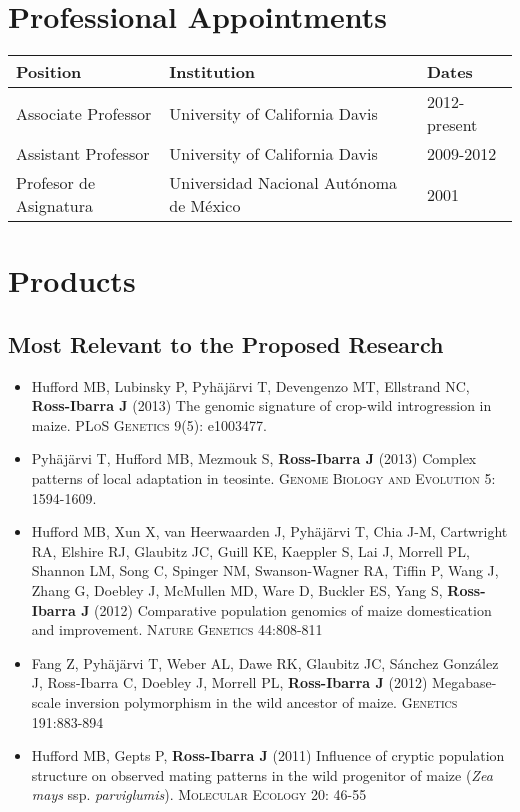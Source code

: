 \documentclass[11pt]{article}
\begin{document}
\section{Professional Appointments}

\begin{tabular}{l l l}
Position & Institution                 & Dates\\
\hline
Associate Professor & University of California Davis &		2012-present \\
Assistant Professor & University of California Davis &		2009-2012 \\
Profesor de Asignatura & Universidad Nacional Aut\'{o}noma de M\'{e}xico & 2001 \\
\hline
\end{tabular}

\section{Products}

\subsection*{Most Relevant to the Proposed Research}

\begin{itemize} \setlength{\itemsep}{0pt} \setlength{\parskip}{2pt} \setlength{\parsep}{0pt}

\item Hufford MB, Lubinsky P, Pyh\"aj\"arvi T, Devengenzo MT, Ellstrand NC, {\bf Ross-Ibarra J} (2013) The genomic signature of crop-wild introgression in maize. \textsc{PLoS Genetics} 9(5): e1003477. 

\item {Pyh\"aj\"arvi T}, {Hufford MB}, {Mezmouk S}, {\bf Ross-Ibarra J} (2013) Complex patterns of local adaptation in teosinte. \textsc{Genome Biology and Evolution} 5: 1594-1609.

\item Hufford MB, Xun X, van Heerwaarden J, Pyh\"aj\"arvi T, Chia J-M, Cartwright RA, Elshire RJ, Glaubitz JC, Guill KE, Kaeppler S, Lai J, Morrell PL, Shannon LM, Song C, Spinger NM, Swanson-Wagner RA, Tiffin P, Wang J, Zhang G, Doebley J, McMullen MD, Ware D, Buckler ES, Yang S, {\bf Ross-Ibarra J} (2012) Comparative population genomics of maize domestication and improvement. \textsc{Nature Genetics} 44:808-811

\item Fang Z, {Pyh\"aj\"arvi T}, Weber AL, Dawe RK, Glaubitz JC, S\'{a}nchez Gonz\'{a}lez J, {Ross-Ibarra C}, Doebley J, Morrell PL, {\bf Ross-Ibarra J}  (2012) Megabase-scale inversion polymorphism in the wild ancestor of maize. \textsc{Genetics} 191:883-894 

\item {Hufford MB}, Gepts P, {\bf Ross-Ibarra J} (2011) Influence of cryptic population structure on observed mating patterns in the wild progenitor of maize (\emph{Zea mays} ssp. \emph{parviglumis}).  \textsc{Molecular Ecology} 20: 46-55

\end{itemize}
\end{document}
